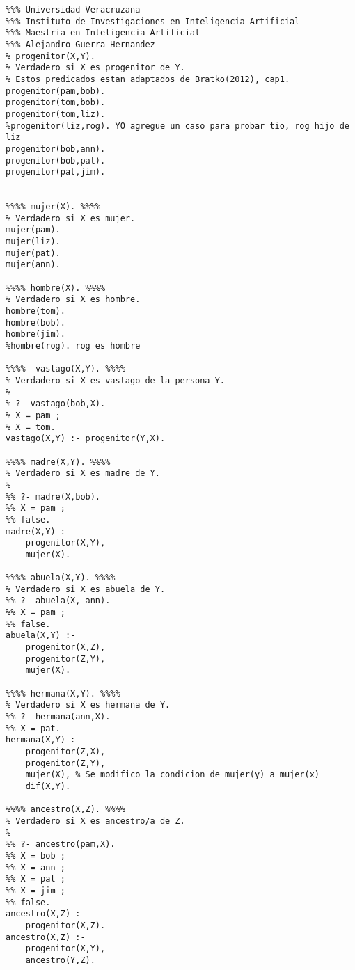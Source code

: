 \documentclass[11pt, letterpaper]{article}
\begin{document}
\begin{lstlisting}
%%% Universidad Veracruzana
%%% Instituto de Investigaciones en Inteligencia Artificial
%%% Maestria en Inteligencia Artificial
%%% Alejandro Guerra-Hernandez
% progenitor(X,Y).
% Verdadero si X es progenitor de Y.
% Estos predicados estan adaptados de Bratko(2012), cap1.
progenitor(pam,bob).
progenitor(tom,bob).
progenitor(tom,liz).
%progenitor(liz,rog). YO agregue un caso para probar tio, rog hijo de liz
progenitor(bob,ann).
progenitor(bob,pat).
progenitor(pat,jim).


%%%% mujer(X). %%%% 
% Verdadero si X es mujer.
mujer(pam).
mujer(liz).
mujer(pat).
mujer(ann).

%%%% hombre(X). %%%% 
% Verdadero si X es hombre.
hombre(tom).
hombre(bob).
hombre(jim).
%hombre(rog). rog es hombre

%%%%  vastago(X,Y). %%%% 
% Verdadero si X es vastago de la persona Y.
%
% ?- vastago(bob,X).
% X = pam ;
% X = tom.
vastago(X,Y) :- progenitor(Y,X).

%%%% madre(X,Y). %%%%
% Verdadero si X es madre de Y.
%
%% ?- madre(X,bob).
%% X = pam ;
%% false.
madre(X,Y) :-
    progenitor(X,Y),
    mujer(X).

%%%% abuela(X,Y). %%%%
% Verdadero si X es abuela de Y.
%% ?- abuela(X, ann).
%% X = pam ;
%% false.
abuela(X,Y) :-
    progenitor(X,Z),
    progenitor(Z,Y),
    mujer(X).

%%%% hermana(X,Y). %%%%
% Verdadero si X es hermana de Y.
%% ?- hermana(ann,X).
%% X = pat.
hermana(X,Y) :-
    progenitor(Z,X),
    progenitor(Z,Y),
    mujer(X), % Se modifico la condicion de mujer(y) a mujer(x)
    dif(X,Y).

%%%% ancestro(X,Z). %%%%
% Verdadero si X es ancestro/a de Z.
%
%% ?- ancestro(pam,X).
%% X = bob ;
%% X = ann ;
%% X = pat ;
%% X = jim ;
%% false.
ancestro(X,Z) :-
    progenitor(X,Z).
ancestro(X,Z) :-
    progenitor(X,Y),
    ancestro(Y,Z).


\end{lstlisting}
\end{document}
